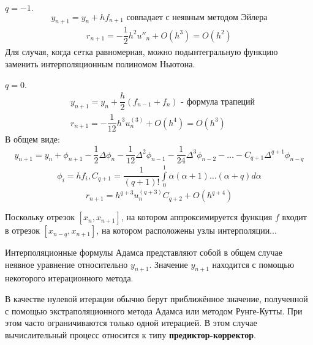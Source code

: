 \begin{examples}
  \item $q = -1$.
  \begin{equation}
    y_{n + 1} = y_n + h f_{n + 1} \text{ совпадает с неявным методом Эйлера}
  \end{equation}
  \begin{align*}
    r_{n + 1} = -\dfrac{1}{2}h^2u''_n + O(h^3) = O(h^2)
  \end{align*}
  Для случая, когда сетка равномерная, можно подынтегральную функцию заменить
  интерполяционным полиномом Ньютона.
  \item $q = 0$.
  \begin{align}
    &y_{n + 1} = y_n + \dfrac{h}{2}(f_{n - 1} + f_n) \text{ - формула трапеций}\\
    \nonumber
    &r_{n + 1} = -\dfrac{1}{12}h^3u_n^{(3)} + O(h^4) = O(h^3)
  \end{align}
  В общем виде:
  \begin{equation}
    y_{n + 1} = y_n + \phi_{n + 1} - \dfrac{1}{2}\Delta\phi_n - \dfrac{1}{12}
    \Delta^2\phi_{n - 1} - \dfrac{1}{24}\Delta^3\phi_{n - 2} - \ldots
    - C_{q + 1}\Delta^{q + 1}\phi_{n - q}
  \end{equation}
  \begin{align*}
    \phi_i = hf_i, C_{q + 1} = \dfrac{1}{(q + 1)!}\int\limits_0^1\alpha
    (\alpha + 1)\ldots(\alpha + q)d\alpha
  \end{align*}
  \begin{equation}
    r_{n + 1} = h^{q + 3}u_n^{(q + 3)}C_{q + 2} + O(h^{q + 4})
  \end{equation}
\end{examples}

Поскольку отрезок $[x_n, x_{n + 1}]$, на котором аппроксимируется функция $f$
входит в отрезок $[x_{n - q}, x_{n + 1}]$, на котором расположены узлы интерполяции...

Интерполяционные формулы Адамса представляют собой в общем случае неявное
уравнение относительно $y_{n + 1}$. Значение $y_{n + 1}$ находится с помощью
некоторого итерационного метода.

В качестве нулевой итерации обычно берут приближённое значение,
полученной с помощью экстраполяционного метода Адамса или методом Рунге-Кутты.
При этом часто ограничиваются только одной итерацией. В этом случае вычислительный
процесс относится к типу \textbf{предиктор-корректор}.
